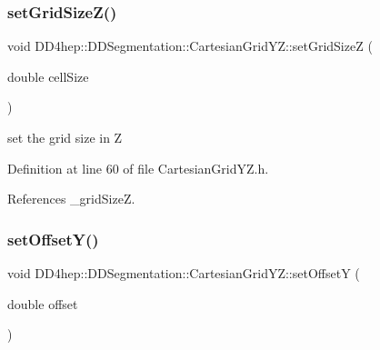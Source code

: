 \hypertarget{class_d_d4hep_1_1_d_d_segmentation_1_1_cartesian_grid_y_z_a96633e1fe0220512513a35ad41136b6d}{}\label{class_d_d4hep_1_1_d_d_segmentation_1_1_cartesian_grid_y_z_a96633e1fe0220512513a35ad41136b6d} 
\subsubsection{\texorpdfstring{set\+Grid\+Size\+Z()}{setGridSizeZ()}}
{\footnotesize\ttfamily void D\+D4hep\+::\+D\+D\+Segmentation\+::\+Cartesian\+Grid\+Y\+Z\+::set\+Grid\+SizeZ (\begin{DoxyParamCaption}\item[{double}]{cell\+Size }\end{DoxyParamCaption})\hspace{0.3cm}{\ttfamily [inline]}}



set the grid size in Z 



Definition at line 60 of file Cartesian\+Grid\+Y\+Z.\+h.



References \+\_\+grid\+SizeZ.

\hypertarget{class_d_d4hep_1_1_d_d_segmentation_1_1_cartesian_grid_y_z_acc72b1c4ab17cebf45e596f6afaf5f2e}{}\label{class_d_d4hep_1_1_d_d_segmentation_1_1_cartesian_grid_y_z_acc72b1c4ab17cebf45e596f6afaf5f2e} 
\subsubsection{\texorpdfstring{set\+Offset\+Y()}{setOffsetY()}}
{\footnotesize\ttfamily void D\+D4hep\+::\+D\+D\+Segmentation\+::\+Cartesian\+Grid\+Y\+Z\+::set\+OffsetY (\begin{DoxyParamCaption}\item[{double}]{offset }\end{DoxyParamCaption})\hspace{0.3cm}{\ttfamily [inline]}}



